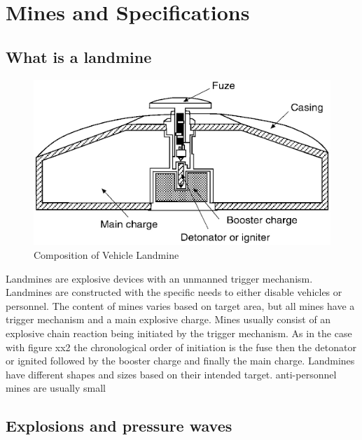 \section{Mines and Specifications}

\subsection{What is a landmine}

\begin{figure}
\centering
\includegraphics[width=\linewidth]{00 - Images/composition of vehicle landmine.png}
  \caption{Composition of Vehicle Landmine \cite{NAP10071}}
  \label{fig:composition of vehicle landmine}
\end{figure}

Landmines are explosive devices with an unmanned trigger mechanism. Landmines are constructed with the specific needs to either disable vehicles or personnel. The content of mines varies based on target area, but all mines have a trigger mechanism and a main explosive charge. Mines usually consist of an explosive chain reaction being initiated by the trigger mechanism. As in the case with figure xx2 the chronological order of initiation is the fuse then the detonator or ignited followed by the booster charge and finally the main charge. Landmines have different shapes and sizes based on their intended target. anti-personnel mines are usually small

\subsection{Explosions and pressure waves}

